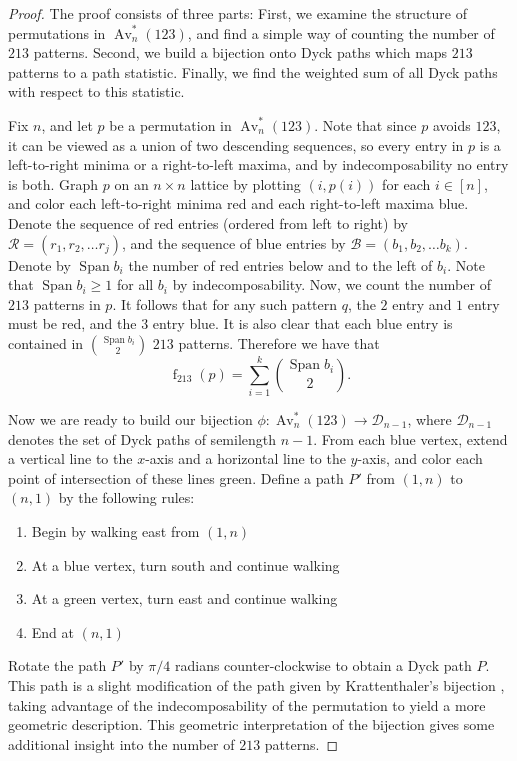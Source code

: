 \documentclass[11pt]{article} %
\theoremstyle{plain}
\theoremstyle{definition}
\newcommand{\Avns}{\Av_n^*(123)}
\newcommand{\D}{\mathcal{D}}
\newcommand{\ra}{\rightarrow}
\newcommand{\R}{\mathcal{R}}
\newcommand{\B}{\mathcal{B}}
\DeclareMathOperator{\Av}{Av}
\DeclareMathOperator{\num}{f}
\DeclareMathOperator{\Sp}{Span}
\begin{document}
  \begin{proof}
    The proof consists of three parts: First, we examine the structure
    of permutations in $\Avns$, and find a simple way of counting the number
    of $213$ patterns. Second, we build a bijection onto Dyck paths
    which maps $213$ patterns to a path statistic. Finally, we find
    the weighted sum of all Dyck paths with respect to this statistic.


    Fix $n$, and let $p$ be a permutation in $\Avns$. Note that since $p$
    avoids $123$, it can be viewed as a union of two descending
    sequences, so every entry in $p$ is a left-to-right minima or a
    right-to-left maxima, and by indecomposability no entry is both.
    Graph $p$ on an $n \times n$ lattice by plotting $(i,p(i))$ for
    each $i \in [n]$, and color each left-to-right minima red and each
    right-to-left maxima blue.  Denote the sequence of red entries
    (ordered from left to right) by $\R=(r_1,r_2,\ldots r_j)$, and the
    sequence of blue entries by $\B=(b_1,b_2,\ldots b_k)$. Denote by
    $\Sp b_i$ the number of red entries below and to the left of
    $b_i$. Note that $\Sp b_i \geq 1$ for all $b_i$ by
    indecomposability. Now, we count the number of $213$ patterns in $p$. It
    follows that for any such pattern $q$, the $2$ entry and $1$ entry
    must be red, and the $3$ entry blue. It is also clear that each
    blue entry is contained in $\binom{\Sp b_i}{2}$ $213$ patterns.
    Therefore we have that
    $$ \num_{213} (p) = \sum_{i=1}^{k} \binom{\Sp b_i}{2}.$$

    Now we are ready to build our bijection $\phi: \Avns \ra
    \D_{n-1}$, where $\D_{n-1}$ denotes the set of Dyck paths of
    semilength $n-1$. From each blue vertex, extend a vertical line to
    the $x$-axis and a horizontal line to the $y$-axis, and color each
    point of intersection of these lines green. Define a path $P'$
    from $(1,n)$ to $(n,1)$ by the following rules:
    \begin{enumerate}[1)]
      \item Begin by walking east from $(1,n)$
      \item At a blue vertex, turn south and continue walking
      \item At a green vertex, turn east and continue walking
      \item End at $(n,1)$
    \end{enumerate}
    Rotate the path $P'$ by $\pi/4$ radians counter-clockwise to
    obtain a Dyck path $P$. This path is a slight modification of the
    path given by Krattenthaler's bijection \cite{krat01}, taking
    advantage of the indecomposability of the permutation to yield a
    more geometric description. This
    geometric interpretation of the bijection gives some additional
    insight into the number of $213$ patterns.


\end{proof}
\end{document}
